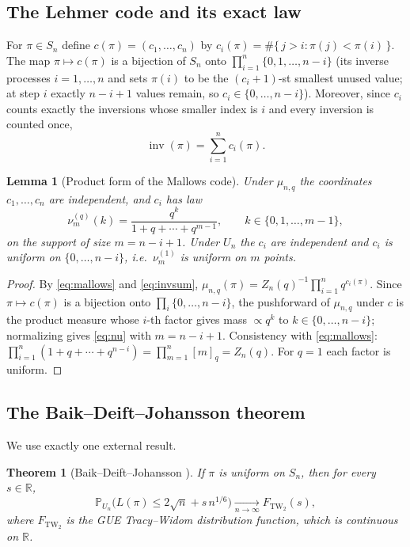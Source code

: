 \documentclass[12pt]{article}
\newtheorem{theorem}{Theorem}
\newtheorem{lemma}{Lemma}
\theoremstyle{definition}
\DeclareMathOperator{\inv}{inv}
\newcommand{\TW}{\mathrm{TW}_2}
\newcommand{\PP}{\mathbb{P}}
\newcommand{\R}{\mathbb{R}}
\begin{document}
\subsection{The Lehmer code and its exact law}\label{sec:code}
For $\pi\in S_n$ define $c(\pi)=(c_1,\dots,c_n)$ by
$c_i(\pi)=\#\{\,j>i:\pi(j)<\pi(i)\,\}$. The map $\pi\mapsto c(\pi)$ is a bijection of
$S_n$ onto $\prod_{i=1}^n\{0,1,\dots,n-i\}$ (its inverse processes $i=1,\dots,n$ and
sets $\pi(i)$ to be the $(c_i{+}1)$-st smallest unused value; at step $i$ exactly
$n-i+1$ values remain, so $c_i\in\{0,\dots,n-i\}$). Moreover, since $c_i$ counts exactly
the inversions whose smaller index is $i$ and every inversion is counted once,
\begin{equation}\label{eq:invsum}
\inv(\pi)=\sum_{i=1}^{n}c_i(\pi).
\end{equation}

\begin{lemma}[Product form of the Mallows code]\label{lem:product}
Under $\mu_{n,q}$ the coordinates $c_1,\dots,c_n$ are independent, and $c_i$ has law
\begin{equation}\label{eq:nu}
\nu^{(q)}_{m}(k)=\frac{q^{k}}{1+q+\cdots+q^{m-1}},\qquad k\in\{0,1,\dots,m-1\},
\end{equation}
on the support of size $m=n-i+1$. Under $U_n$ the $c_i$ are independent and $c_i$ is
uniform on $\{0,\dots,n-i\}$, i.e.\ $\nu^{(1)}_m$ is uniform on $m$ points.
\end{lemma}

\begin{proof}
By \eqref{eq:mallows} and \eqref{eq:invsum},
$\mu_{n,q}(\pi)=Z_n(q)^{-1}\prod_{i=1}^n q^{c_i(\pi)}$. Since $\pi\mapsto c(\pi)$ is a
bijection onto $\prod_i\{0,\dots,n-i\}$, the pushforward of $\mu_{n,q}$ under $c$ is the
product measure whose $i$-th factor gives mass $\propto q^k$ to $k\in\{0,\dots,n-i\}$;
normalizing gives \eqref{eq:nu} with $m=n-i+1$. Consistency with \eqref{eq:mallows}:
$\prod_{i=1}^n(1+q+\cdots+q^{n-i})=\prod_{m=1}^n[m]_q=Z_n(q)$. For $q=1$ each factor is
uniform.
\end{proof}

\subsection{The Baik--Deift--Johansson theorem}\label{sec:bdj}
We use exactly one external result.

\begin{theorem}[Baik--Deift--Johansson \cite{BDJ}]\label{thm:BDJ}
If $\pi$ is uniform on $S_n$, then for every $s\in\R$,
\[
\PP_{U_n}\!\big(L(\pi)\le 2\sqrt n+s\,n^{1/6}\big)\xrightarrow[n\to\infty]{}F_{\TW}(s),
\]
where $F_{\TW}$ is the GUE Tracy--Widom distribution function, which is continuous on
$\R$.
\end{theorem}
\end{document}
